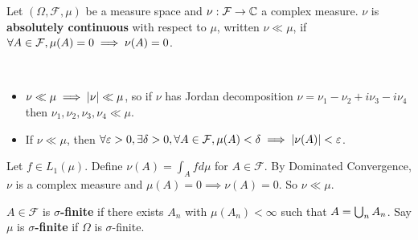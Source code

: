 \documentclass{article}
\begin{document}
\begin{defi}
  Let $(\Omega, \mathcal F, \mu)$ be a measure space and $\nu : \mathcal F \rightarrow \mathbb C$ a complex measure. $\nu$ is {\bf absolutely continuous} with respect to $\mu$, written $\nu \ll \mu$, if $\forall A \in \mathcal F, \mu(A) = 0 \implies \nu(A) = 0$.
\end{defi}

\begin{rmks}~
  \begin{itemize}
    \item $\nu \ll \mu \implies \left\lvert \nu\right\rvert \ll \mu$, so if $\nu$ has Jordan decomposition $\nu = \nu_1 - \nu_2 + i\nu_3 - i\nu_4$ then $\nu_1, \nu_2, \nu_3, \nu_4 \ll \mu$.
    \item If $\nu \ll \mu$, then $\forall \varepsilon > 0, \exists \delta > 0, \forall A \in \mathcal F, \mu(A) < \delta \implies \left\lvert \nu(A)\right\rvert < \varepsilon$.
  \end{itemize}
\end{rmks}

\begin{eg}
  Let $f \in L_1(\mu)$. Define $\nu(A) = \int_A f d\mu$ for $A \in \mathcal F$. By Dominated Convergence, $\nu$ is a complex measure and $\mu(A) = 0 \implies \nu(A) = 0$. So $\nu \ll \mu$.
\end{eg}

\begin{defi}
  $A \in \mathcal F$ is {\bf $\sigma$-finite} if there exists $A_n$ with $\mu(A_n) < \infty$ such that $A = \bigcup_n A_n$. Say $\mu$ is {\bf $\sigma$-finite} if $\Omega$ is $\sigma$-finite.
\end{defi}
\end{document}
